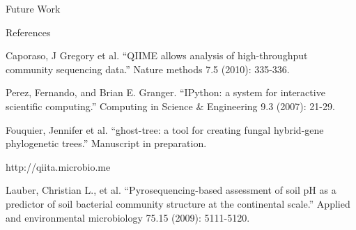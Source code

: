 \documentclass[final,t]{beamer}
\begin{document}
\begin{frame}{}
\begin{columns}[t]
\begin{column}{.3\linewidth}
\begin{block}{Future Work}
        \end{block}
        \begin{block}{References}
            \begin{itemize}
              {\small
              \item[1]Caporaso, J Gregory et al. ``QIIME allows analysis of high-throughput community sequencing data.'' Nature methods 7.5 (2010): 335-336.
              \item[2]Perez, Fernando, and Brian E. Granger. ``IPython: a system for interactive scientific computing.'' Computing in Science \& Engineering 9.3 (2007): 21-29.
              \item[3]Fouquier, Jennifer et al. ``ghost-tree: a tool for creating fungal hybrid-gene phylogenetic trees.'' Manuscript in preparation.
              \item[4]http://qiita.microbio.me
              \item[5]Lauber, Christian L., et al. ``Pyrosequencing-based assessment of soil pH as a predictor of soil bacterial community structure at the continental scale.'' Applied and environmental microbiology 75.15 (2009): 5111-5120.
              }
          \end{itemize}
        \end{block}





    \end{column}
  \end{columns}

\end{frame}
\end{document}
